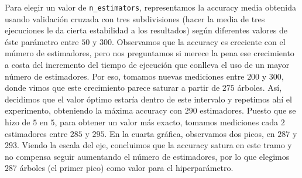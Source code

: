 \documentclass[a4]{article}
\begin{document}
Para elegir un valor de \texttt{n\_estimators}, representamos la
accuracy media obtenida usando validación cruzada con tres
subdivisiones (hacer la media de tres ejecuciones le da cierta
estabilidad a los resultados) según diferentes valores de éste
parámetro entre $50$ y $300$. Observamos que la accuracy es
creciente con el múmero de estimadores, pero nos preguntamos si merece
la pena ese crecimiento a costa del incremento del tiempo de ejecución
que conlleva el uso de un mayor número de estimadores. Por eso,
tomamos nuevas mediciones entre $200$ y $300$, donde vimos que este
crecimiento parece saturar a partir de $275$ árboles. Así, decidimos
que el valor óptimo estaría dentro de este intervalo y repetimos ahí
el experimento, obteniendo la máxima accuracy con $290$
estimadores. Puesto que se hizo de $5$ en $5$, para obtener un valor
más exacto, tomamos mediciones cada $2$ estimadores entre $285$ y
$295$. En la cuarta gráfica, observamos dos picos, en $287$ y
$293$. Viendo la escala del eje, concluimos que la accuracy
satura en este tramo y no compensa seguir aumentando el número de
estimadores, por lo que elegimos $287$ árboles (el primer pico) como valor para el hiperparámetro.
\end{document}
